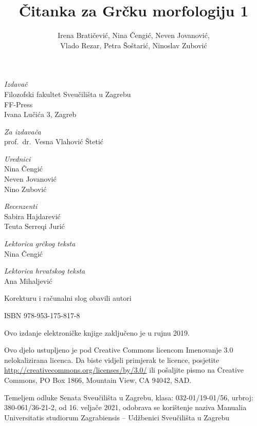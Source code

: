 \documentclass[a4paper,12pt,twoside]{report}
\def\secondpage{\clearpage\null\vfill
\pagestyle{empty}
\begin{minipage}[b]{0.9\textwidth}
\begin{center}
\textit{Izdavač}\\
Filozofski fakultet Sveučilišta u Zagrebu\\
FF-Press\\
Ivana Lučića 3, Zagreb

\bigskip

\textit{Za izdavača}\\
prof.\ dr.\ Vesna Vlahović Štetić

\bigskip

\textit{Urednici}\\
Nina Čengić\\
Neven Jovanović\\
Nino Zubović

\bigskip

\textit{Recenzenti}\\
Sabira Hajdarević\\
Teuta Serreqi Jurić

\bigskip

\textit{Lektorica grčkog teksta}\\
Nina Čengić

\textit{Lektorica hrvatskog teksta}\\
Ana Mihaljević

\bigskip

Korekturu i računalni slog obavili autori

\bigskip

ISBN 978-953-175-817-8

\bigskip

Ovo izdanje elektroničke knjige zaključeno je u rujnu 2019.




\end{center}
\footnotesize\raggedright
\setlength{\parskip}{0.5\baselineskip}
\noindent Ovo djelo ustupljeno je pod Creative Commons licencom Imenovanje 3.0 nelokalizirana licenca. Da biste vidjeli primjerak te licence, posjetite \url{http://creativecommons.org/licenses/by/3.0/} ili pošaljite pismo na Creative Commons, PO Box 1866, Mountain View, CA 94042, SAD. 

\noindent Temeljem odluke Senata Sveučilišta u Zagrebu, klasa: 032-01/19-01/56, urbroj: 380-061/36-21-2, od 16. veljače 2021, odobrava se korištenje naziva Manualia Universitatis studiorum Zagrabiensis – Udžbenici Sveučilišta u Zagrebu
\end{minipage}
\vspace*{3\baselineskip}
}
\begin{document}
\title{Čitanka za Grčku morfologiju 1}
\author{Irena Bratičević, Nina Čengić, Neven Jovanović,\\Vlado Rezar, Petra Šoštarić, Ninoslav Zubović}
\date{}
\secondpage
\end{document}

